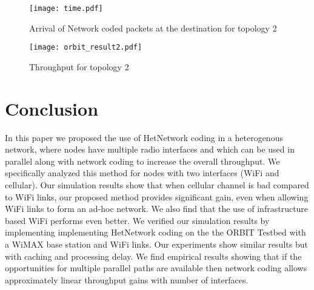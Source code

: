 \documentclass{sig-alternate-10pt}
\begin{document}
\begin{figure}[t]
\texttt{[image: time.pdf]}
\caption{Arrival of Network coded packets at the destination for topology 2}
\label{fig:time}
\end{figure}

\begin{figure}[t]
\texttt{[image: orbit\_result2.pdf]}
\caption{Throughput for topology 2}
\label{fig:orbitres2}
\end{figure}


\section{Conclusion}
In this paper we proposed the use of HetNetwork coding  in a heterogenous  network, where nodes have multiple radio interfaces and which can be used in parallel along with network coding to increase the overall throughput. We specifically analyzed this method for nodes with two interfaces (WiFi and cellular). Our simulation results show that when cellular channel is bad compared to WiFi links, our proposed method provides significant gain, even when allowing WiFi links to form an ad-hoc network. We also find that the use of infrastructure based WiFi performs even better. We verified our simulation results by implementing implementing HetNetwork coding on the the ORBIT Testbed with a WiMAX base station and WiFi links. Our experiments show similar results but with caching and processing delay. We find empirical results showing that if the opportunities for multiple parallel paths are available then network coding allows approximately linear throughput gains with number of interfaces.




\end{document}
